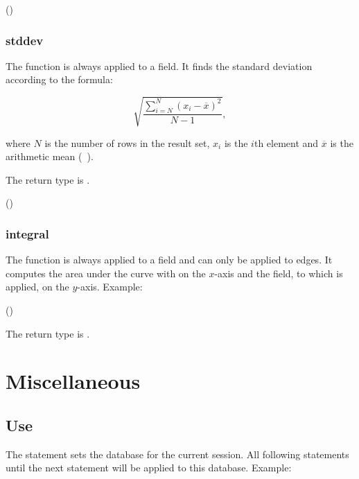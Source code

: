  ()
 


\subsubsection{stddev}
The function is always applied to a field.
It finds the standard deviation according to the formula:

\[
\sqrt{\frac{\sum_{i=N}^{N}{(x_i - \overline{x})^2}}{N-1}},
\]

where $N$ is the number of rows in the result set,
$x_i$ is the $i$th element and $\overline{x}$ is
the arithmetic mean (\ie\ ).

The return type is .

 ()
 


\subsubsection{integral}
The function is always applied to a field and
can only be applied to edges.
It computes the area under the curve with
 on the $x$-axis and the field,
to which  is applied,
on the $y$-axis. Example:

 ()
 

The return type is .


\section{Miscellaneous}
\subsection{Use}
The  statement sets the database for
the current session. All following statements
 until the next  statement
will be applied to this database.
Example:

 

